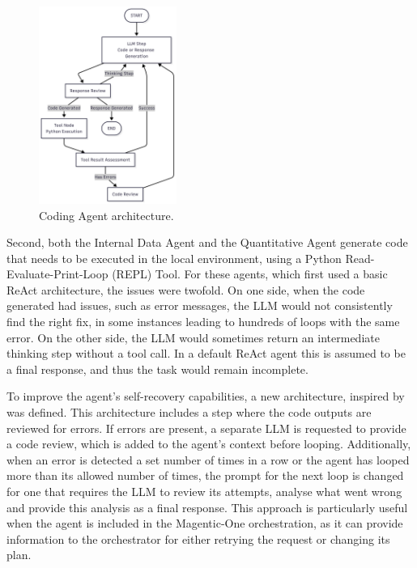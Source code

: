 \documentclass[a4paper]{report}
\begin{document}
\begin{figure}[h]
\centering
\includegraphics[width=0.4\textwidth]{images/coding-workflow.png}
\caption{Coding Agent architecture.}
\label{fig:coding-workflow}
\end{figure}

Second, both the Internal Data Agent and the Quantitative Agent generate code that needs to be executed in the local environment, using a Python Read-Evaluate-Print-Loop (REPL) Tool. For these agents, which first used a basic ReAct architecture, the issues were twofold. On one side, when the code generated had issues, such as error messages, the LLM would not consistently find the right fix, in some instances leading to hundreds of loops with the same error. On the other side, the LLM would sometimes return an intermediate thinking step without a tool call. In a default ReAct agent this is assumed to be a final response, and thus the task would remain incomplete.

To improve the agent's self-recovery capabilities, a new architecture, inspired by \cite{shinn2023reflexion} was defined. This architecture includes a step where the code outputs are reviewed for errors. If errors are present, a separate LLM is requested to provide a code review, which is added to the agent's context before looping. Additionally, when an error is detected a set number of times in a row or the agent has looped more than its allowed number of times, the prompt for the next loop is changed for one that requires the LLM to review its attempts, analyse what went wrong and provide this analysis as a final response. This approach is particularly useful when the agent is included in the Magentic-One orchestration, as it can provide information to the orchestrator for either retrying the request or changing its plan.
\end{document}
